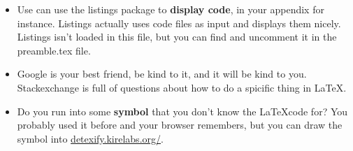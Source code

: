 \documentclass[thesis]{subfiles}
\begin{document}
\begin{itemize}
\item Use can use the listings package to \textbf{display code}, in your appendix for instance. Listings actually uses code files as input and displays them nicely. Listings isn't loaded in this file, but you can find and uncomment it in the preamble.tex file.

\item Google is your best friend, be kind to it, and it will be kind to you. Stackexchange is full of questions about how to do a spicific thing in \LaTeX.

\item Do you run into some \textbf{symbol} that you don't know the \LaTeX code for? You probably used it before and your browser remembers, but you can draw the symbol into \url{detexify.kirelabs.org/}.
\end{itemize}
\end{document}
